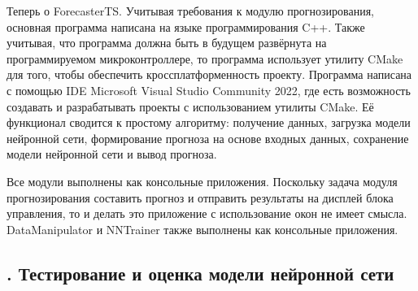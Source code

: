 {  \par \redline Теперь о ForecasterTS. Учитывая требования к модулю прогнозирования, основная программа написана на языке программирования C++. Также учитывая, что программа должна быть в будущем развёрнута на программируемом микроконтроллере, то программа использует утилиту CMake для того, чтобы обеспечить кроссплатформенность проекту. Программа написана с помощью IDE Microsoft Visual Studio Community 2022, где есть возможность создавать и разрабатывать проекты с использованием утилиты CMake. Её функционал сводится к простому алгоритму: получение данных, загрузка модели нейронной сети, формирование прогноза на основе входных данных, сохранение модели нейронной сети и вывод прогноза. 

  \par \redline Все модули выполнены как консольные приложения. Поскольку задача модуля прогнозирования составить прогноз и отправить результаты на дисплей блока управления, то и делать это приложение с использование окон не имеет смысла. DataManipulator и NNTrainer также выполнены как консольные приложения. 

}

\subtitlespace

\subsection*{ 
  \gostTitleFont
  \redline
  \thechaptercntr .\thesubchaptercntr \spc 
  Тестирование и оценка модели нейронной сети
} \addtocounter{subchaptercntr}{1} 
  
\subtitlespace
  
